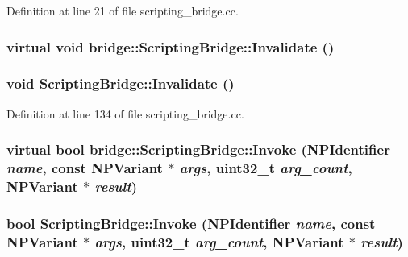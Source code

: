 Definition at line 21 of file scripting\_\-bridge.cc.

\hypertarget{classbridge_1_1_scripting_bridge_a956430a5ae42b3e30c3e1b4655322061}{
\subsubsection[{Invalidate}]{\setlength{\rightskip}{0pt plus 5cm}virtual void bridge::ScriptingBridge::Invalidate ()}}
\label{classbridge_1_1_scripting_bridge_a956430a5ae42b3e30c3e1b4655322061}
\hypertarget{classbridge_1_1_scripting_bridge_af00ea5a26438b33f976734a3432dfa9b}{
\subsubsection[{Invalidate}]{\setlength{\rightskip}{0pt plus 5cm}void ScriptingBridge::Invalidate ()}}
\label{classbridge_1_1_scripting_bridge_af00ea5a26438b33f976734a3432dfa9b}


Definition at line 134 of file scripting\_\-bridge.cc.

\hypertarget{classbridge_1_1_scripting_bridge_a84f78dde38b524b61e72afebf7210483}{
\subsubsection[{Invoke}]{\setlength{\rightskip}{0pt plus 5cm}virtual bool bridge::ScriptingBridge::Invoke (NPIdentifier {\em name}, \/  const NPVariant $\ast$ {\em args}, \/  uint32\_\-t {\em arg\_\-count}, \/  NPVariant $\ast$ {\em result})}}
\label{classbridge_1_1_scripting_bridge_a84f78dde38b524b61e72afebf7210483}
\hypertarget{classbridge_1_1_scripting_bridge_ad18d2af321b2cba1235876cf281295df}{
\subsubsection[{Invoke}]{\setlength{\rightskip}{0pt plus 5cm}bool ScriptingBridge::Invoke (NPIdentifier {\em name}, \/  const NPVariant $\ast$ {\em args}, \/  uint32\_\-t {\em arg\_\-count}, \/  NPVariant $\ast$ {\em result})}}
\label{classbridge_1_1_scripting_bridge_ad18d2af321b2cba1235876cf281295df}


